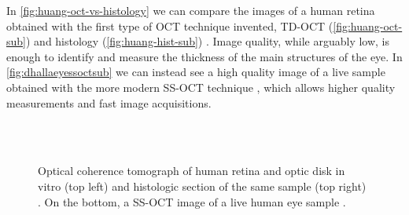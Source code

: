 In \autoref{fig:huang-oct-vs-histology} we can compare the images of a human retina obtained with the first type of OCT technique invented, \acf{TD-OCT}
(\autoref{fig:huang-oct-sub}) and histology (\autoref{fig:huang-hist-sub}) \citep{Huang1991}. Image quality, while arguably low, is enough to identify and measure the thickness of the main structures of the eye. In \autoref{fig:dhallaeyessoctsub} we can instead see a high quality image of a live sample obtained with the more modern \acf{SS-OCT} technique \citep{Dhalla2012}, which allows higher quality measurements and fast image acquisitions. \\ 

\begin{figure}[hbt]
\myfloatalign
{} \quad
{}\\
\\
\caption[OCT and histological images of the human eye.]{Optical coherence tomograph of human retina and optic disk in vitro (top left) and histologic section of the same sample (top right) \citep{Huang1991}. On the bottom, a \ac{SS-OCT} image of a live human eye sample \citep{Dhalla2012}. }\label{fig:huang-oct-vs-histology}
\end{figure}



